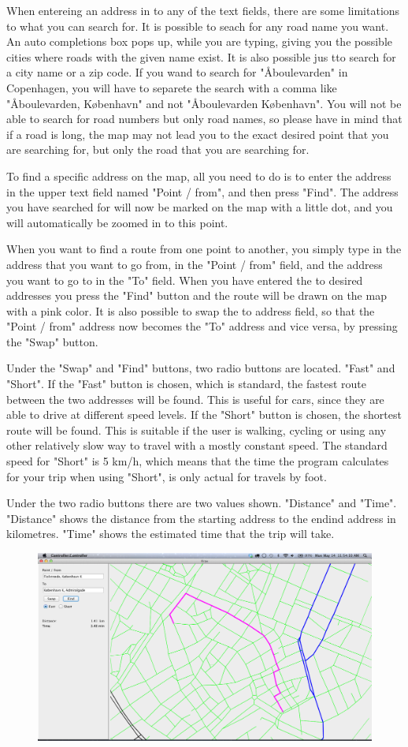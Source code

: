 When entereing an address in to any of the text fields, there are some limitations to what you can search for. It is possible to seach for any road name you want. An auto completions box pops up, while you are typing, giving you the possible cities where roads with the given name exist. It is also possible jus tto search for a city name or a zip code. If you wand to search for "Åboulevarden" in Copenhagen, you will have to separete the search with a comma like "Åboulevarden, København" and not "Åboulevarden København". You will not be able to search for road numbers but only road names, so please have in mind that if a road is long, the map may not lead you to the exact desired point that you are searching for, but only the road that you are searching for.

To find a specific address on the map, all you need to do is to enter the address in the upper text field named "Point / from", and then press "Find". The address you have searched for will now be marked on the map with a little dot, and you will automatically be zoomed in to this point.

When you want to find a route from one point to another, you simply type in the address that you want to go from, in the "Point / from" field, and the address you want to go to in the "To" field. When you have entered the to desired addresses you press the "Find" button and the route will be drawn on the map with a pink color. 
It is also possible to swap the to address field, so that the "Point / from" address now becomes the "To" address and vice versa, by pressing the "Swap" button.

Under the "Swap" and "Find" buttons, two radio buttons are located. "Fast" and "Short". If the "Fast" button is chosen, which is standard, the fastest route between the two addresses will be found. This is useful for cars, since they are able to drive at different speed levels. If the "Short" button is chosen, the shortest route will be found. This is suitable if the user is walking, cycling or using any other relatively slow way to travel with a mostly constant speed. The standard speed for "Short" is 5 km/h, which means that the time the program calculates for your trip when using "Short", is only actual for travels by foot.

Under the two radio buttons there are two values shown. "Distance" and "Time". "Distance" shows the distance from the starting address to the endind address in kilometres. "Time" shows the estimated time that the trip will take. 

\begin{figure}[htb]
\includegraphics{screenshot.png}
\end{figure}
